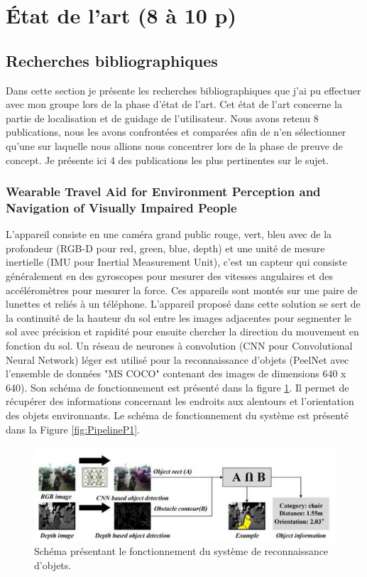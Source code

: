 \documentclass[11pt]{article}
\begin{document}
  \section{État de l'art (8 à 10 p)}  
  \subsection{Recherches bibliographiques}
  Dans cette section je présente les recherches bibliographiques que j'ai pu effectuer avec mon groupe lors de la phase d'état de l'art.
  Cet état de l'art concerne la partie de localisation et de guidage de l'utilisateur. Nous avons retenu 8 publications, nous les avons 
  confrontées et comparées afin de n'en sélectionner qu'une sur laquelle nous allions nous concentrer lors de la phase de preuve de 
  concept. Je présente ici 4 des publications les plus pertinentes sur le sujet.

  \subsubsection{Wearable Travel Aid for Environment Perception and Navigation of
  Visually Impaired People}

  L'appareil consiste en une caméra grand public rouge, vert, bleu avec de la profondeur (RGB-D pour red, green, blue, depth)
  et une unité de mesure inertielle (IMU pour Inertial Measurement Unit), c'est un capteur qui consiste généralement en des gyroscopes 
  pour mesurer des vitesses angulaires et des accéléromètres pour mesurer la force. Ces appareils sont montés sur une paire de lunettes
  et reliés à un téléphone. L'appareil proposé dans cette solution se sert de la continuité de la hauteur du sol entre les images 
  adjacentes pour segmenter le sol avec précision et rapidité pour ensuite chercher la direction du mouvement en fonction du sol.
  Un réseau de neurones à convolution (CNN pour Convolutional Neural Network) léger est utilisé pour la reconnaissance d'objets 
  (PeelNet avec l'ensemble de données "MS COCO" contenant des images de dimensions 640 x 640). Son schéma de fonctionnement est présenté 
  dans la figure \ref{fig:ReconnaissanceP1}. Il permet de récupérer des informations concernant les endroits aux alentours et l'orientation 
  des objets environnants. Le schéma de fonctionnement du système est présenté dans la Figure \ref{fig:PipelineP1}.

  \begin{figure}[hbt]  
    \includegraphics[width=\textwidth]{RecognitionP1.png}    
    \caption{Schéma présentant le fonctionnement du système de reconnaissance d'objets.}
    \label{fig:ReconnaissanceP1}
  \end{figure} 
\end{document}
